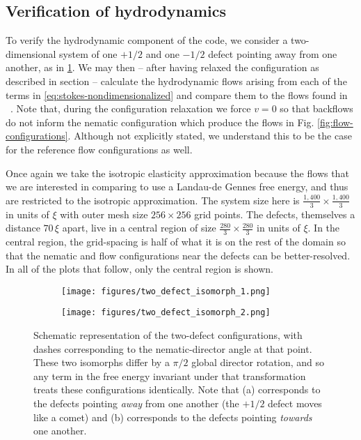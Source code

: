 \documentclass[reqno]{article}
\begin{document}
  \subsection{Verification of hydrodynamics} \label{verification-of-hydrodynamics}
  To verify the hydrodynamic component of the code, we consider a
  two-dimensional system of one
  $+1/2$ and one $-1/2$ defect pointing away from one another, as in
  \ref{fig:two-defect-isomorph-1}.
  We may then -- after having relaxed the configuration as described in
  section \label{algorithm details} --
  calculate the hydrodynamic flows arising from each of the terms in
  \eqref{eq:stokes-nondimensionalized} and compare them to the flows found in
  ~\cite{svensek_complex_2002}.
  Note that, during the configuration relaxation we force $v = 0$ so that
  backflows do not inform the nematic configuration which produce the flows in
  Fig. \ref{fig:flow-configurations}.
  Although not explicitly stated, we understand this to be the case for the
  reference flow configurations as well.
  
  Once again we take the isotropic elasticity approximation because the flows
  that we are interested in comparing to use a Landau-de Gennes free energy, and
  thus are restricted to the isotropic approximation.
  The system size here is $\frac{1,400}{3} \times \frac{1,400}{3}$ in units of
  $\xi$ with outer mesh size $256\times 256$ grid points.
  The defects, themselves a distance $70 \, \xi$ apart, live in a central region of
  size $\frac{280}{3} \times \frac{280}{3}$ in units of $\xi$.
  In the central region, the grid-spacing is half of what it is on the rest of
  the domain so that the nematic and flow configurations near the defects can be
  better-resolved.
  In all of the plots that follow, only the central region is shown.
  
  \begin{figure}[h]
    \centering
    \begin{subfigure}{0.45\textwidth}
      \texttt{[image: figures/two\_defect\_isomorph\_1.png]}
      \caption{}
      \label{fig:two-defect-isomorph-1}
    \end{subfigure}
    \hfill
    \begin{subfigure}{0.45\textwidth}
      \texttt{[image: figures/two\_defect\_isomorph\_2.png]}
      \caption{}
      \label{fig:two-defect-isomorph-2}
    \end{subfigure}
    \caption{Schematic representation of the two-defect configurations, with
      dashes corresponding to the nematic-director angle at that point. These
      two isomorphs differ by a $\pi/2$ global director rotation, and so any
      term in the free energy invariant under that transformation treats these
      configurations identically. Note that (a) corresponds to the defects
      pointing \textit{away} from one another (the $+1/2$ defect moves like a
      comet) and (b) corresponds to the defects pointing \textit{towards} one another.}
  \end{figure}
  
\end{document}

